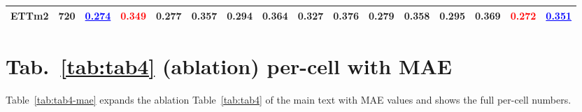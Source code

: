 \begin{table}[h]
\begin{center}
\begin{tabular}{ll|cc|cc|cc|cc|cc|cc|cc}
    ETTm2 & 720 & \textcolor{blue}{\underline{0.274}} & \textcolor{red}{\textbf{0.349}} & 0.277 & 0.357 & 0.294 & 0.364 & 0.327 & 0.376 & 0.279 & 0.358 & 0.295 & 0.369 & \textcolor{red}{\textbf{0.272}} & \textcolor{blue}{\underline{0.351}} \\
    \bottomrule
  \end{tabular}
  \end{center}
\end{table}

\section{Tab.~\ref{tab:tab4} (ablation) per-cell with MAE}
\label{app:tab4-mae}

Table~\ref{tab:tab4-mae} expands the ablation
Table~\ref{tab:tab4} of the main text with MAE values and shows
the full per-cell numbers.

